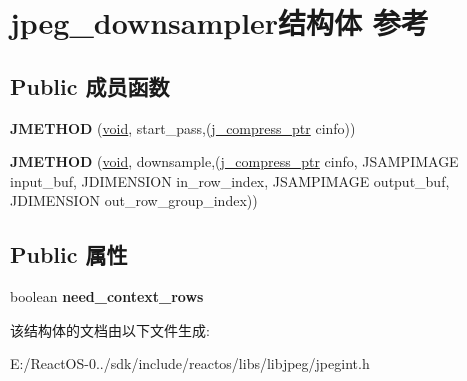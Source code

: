 \hypertarget{structjpeg__downsampler}{}\section{jpeg\+\_\+downsampler结构体 参考}
\label{structjpeg__downsampler}
\subsection*{Public 成员函数}
\begin{DoxyCompactItemize}
\item 
\mbox{\label{structjpeg__downsampler_a1ca33229e63cdb80020c714f1cd28ea0}} 
{\bfseries J\+M\+E\+T\+H\+OD} (\hyperlink{interfacevoid}{void}, start\+\_\+pass,(\hyperlink{structjpeg__compress__struct}{j\+\_\+compress\+\_\+ptr} cinfo))
\item 
\mbox{\label{structjpeg__downsampler_a611ebcb0ae11e4d1c6ba4222caacaec4}} 
{\bfseries J\+M\+E\+T\+H\+OD} (\hyperlink{interfacevoid}{void}, downsample,(\hyperlink{structjpeg__compress__struct}{j\+\_\+compress\+\_\+ptr} cinfo, J\+S\+A\+M\+P\+I\+M\+A\+GE input\+\_\+buf, J\+D\+I\+M\+E\+N\+S\+I\+ON in\+\_\+row\+\_\+index, J\+S\+A\+M\+P\+I\+M\+A\+GE output\+\_\+buf, J\+D\+I\+M\+E\+N\+S\+I\+ON out\+\_\+row\+\_\+group\+\_\+index))
\end{DoxyCompactItemize}
\subsection*{Public 属性}
\begin{DoxyCompactItemize}
\item 
\mbox{\label{structjpeg__downsampler_ab177a119691924a4bdd2223df7f5ed08}} 
boolean {\bfseries need\+\_\+context\+\_\+rows}
\end{DoxyCompactItemize}


该结构体的文档由以下文件生成\+:\begin{DoxyCompactItemize}
\item 
E\+:/\+React\+O\+S-\/0../sdk/include/reactos/libs/libjpeg/jpegint.\+h\end{DoxyCompactItemize}

